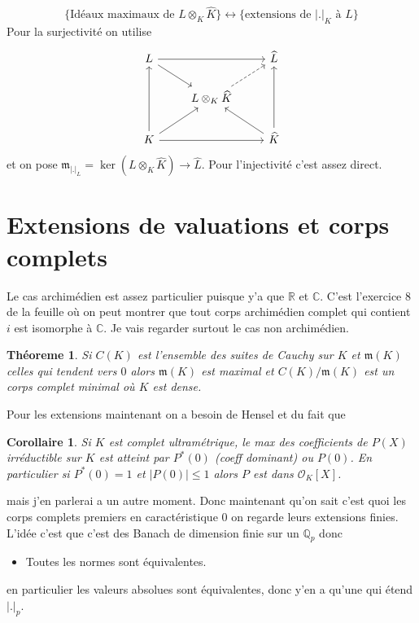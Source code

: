 \documentclass[a4paper,12pt]{book}
\newcommand{\R}{\mathbb{R}}
\newcommand{\Q}{\mathbb{Q}}
\newcommand{\C}{\mathbb{C}}
\newcommand{\Or}{\mathcal{O}}
\newcommand{\m}{\mathfrak m}
\theoremstyle{plain}
\newtheorem{thm}{Théoreme}
\newtheorem{cor}{Corollaire}
\theoremstyle{definition}
\theoremstyle{remark}
\begin{document}
\[\{\textrm{Idéaux maximaux de }L\otimes_K\widehat K\}\leftrightarrow\{\textrm{extensions de $|.|_K$ à $L$}\}\]
Pour la surjectivité on utilise %
\[\begin{tikzcd}
	L && {\widehat L} \\
	& {L\otimes_K \widehat K} \\
	K && {\widehat K}
	\arrow[from=1-1, to=1-3]
	\arrow[from=1-1, to=2-2]
	\arrow[dashed, from=2-2, to=1-3]
	\arrow[from=3-1, to=1-1]
	\arrow[from=3-1, to=2-2]
	\arrow[from=3-1, to=3-3]
	\arrow[from=3-3, to=1-3]
	\arrow[from=3-3, to=2-2]
\end{tikzcd}\]
et on pose $\m_{|.|_L}=\ker(L\otimes_K \widehat K)\to \widehat L$. Pour
l'injectivité c'est assez direct.

\section{Extensions de valuations et corps complets}
Le cas archimédien est assez particulier puisque y'a que $\R$ et $\C$.
C'est l'exercice $8$ de la feuille où on peut montrer que tout corps
archimédien complet qui contient $i$ est isomorphe à $\C$. Je
vais regarder surtout le cas non archimédien.
\begin{thm}
    Si $C(K)$ est l'ensemble des suites de Cauchy sur $K$ et $\m(K)$
    celles qui tendent vers $0$ alors $\m(K)$ est maximal et
    $C(K)/\m(K)$ est un corps complet minimal où $K$ est dense.
\end{thm}
Pour les extensions maintenant on a besoin de Hensel et du fait que
\begin{cor}
    Si $K$ est complet ultramétrique, le max des coefficients de $P(X)$
    irréductible sur $K$ est atteint par $P^*(0)$ (coeff dominant)
    ou $P(0)$. En particulier si $P^*(0)=1$ et $|P(0)|\leq 1$ alors
    $P$ est dans $\Or_K[X]$.
\end{cor}
mais j'en parlerai a un autre moment. Donc maintenant qu'on sait c'est
quoi les corps complets premiers en caractéristique $0$ on regarde
leurs extensions finies. L'idée c'est que c'est des Banach de dimension
finie sur un $\Q_p$ donc
\begin{itemize}
    \item Toutes les normes sont équivalentes.
\end{itemize}
en particulier les valeurs absolues sont équivalentes, donc y'en a 
qu'une qui étend $|.|_p$.
\end{document}
